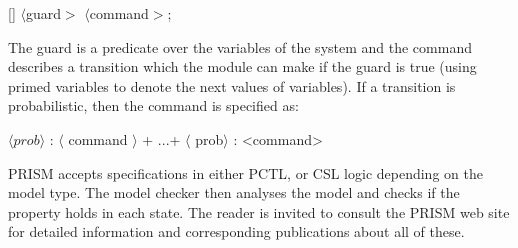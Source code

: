 \documentclass{llncs}
\begin{document}
[] $\langle$guard$>$ \! $\langle$command$>$;

The guard is a predicate over the variables of the system and the command describes
a transition which the module can make if the guard is true (using primed variables
to denote the next values of variables). If a transition is probabilistic, then the
command is specified as:

$\langle prob \rangle$ : $\langle$ command $\rangle$ + ...+ $\langle$ prob$\rangle$ : <command>

PRISM accepts specifications in either PCTL, or CSL logic depending on the model
type. The model checker then analyses the model and checks if the property holds in each
state.
The reader is invited to consult the PRISM
web site \cite{} for detailed information and corresponding
publications about all of these.
\end{document}
